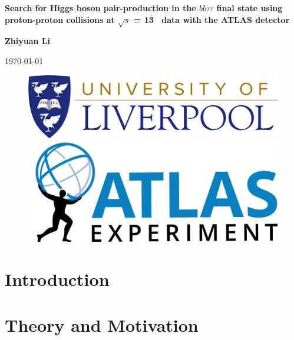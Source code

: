 \documentclass[twoside,11pt]{report}
\newcommand{\changefont}{\fontsize{9}{11}\selectfont}
\newcommand{\changefontbig}{\fontsize{12}{14}\selectfont}
\begin{document}
\fancyhead{}
\begin{titlepage}
	\centering
	{\LARGE \textbf{Search for Higgs boson pair-production in the $bb\tau\tau$ final state using proton-proton collisions at $\sqrt{s}$ = 13 \TeV\ data with the ATLAS detector} \par}
	\vspace{1cm}
	{\LARGE \textbf{Zhiyuan Li} \par}
	\vspace{0.2cm}
	\today
	\vspace{3cm}
	\begin{figure}[htp]
		\centering
		\includegraphics[width=.5\textwidth]{logo.png}
		\vspace{3em}
		\centering
		\includegraphics[width=.45\textwidth]{ATLAS-Logo-Ref-RGB-H_1.jpg}
		\end{figure}
\end{titlepage}

\tableofcontents{}
\printindex{}

\newpage
{}
\fancyhead[RE]{\changefont \rightmark}
\fancyhead[LO]{\changefontbig \textbf{\chaptername . \thechapter}}
\large
\chapter{Introduction}
\chapter{Theory and Motivation}

\end{document}
